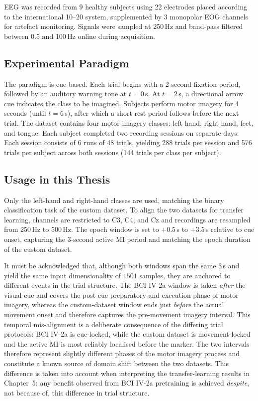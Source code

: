 \documentclass[english, bc, kiv, he, iso690alph, pdf]{fasthesis}
\begin{document}
EEG was recorded from 9 healthy subjects using 22 electrodes placed according to the international 10--20 system, supplemented by 3 monopolar EOG channels for artefact monitoring. Signals were sampled at 250\,Hz and band-pass filtered between 0.5 and 100\,Hz online during acquisition.

\subsection{Experimental Paradigm}

The paradigm is cue-based. Each trial begins with a 2-second fixation period, followed by an auditory warning tone at $t = 0$\,s. At $t = 2$\,s, a directional arrow cue indicates the class to be imagined. Subjects perform motor imagery for 4 seconds (until $t = 6$\,s), after which a short rest period follows before the next trial. The dataset contains four motor imagery classes: left hand, right hand, feet, and tongue. Each subject completed two recording sessions on separate days. Each session consists of 6 runs of 48 trials, yielding 288 trials per session and 576 trials per subject across both sessions (144 trials per class per subject).

\subsection{Usage in this Thesis}

Only the left-hand and right-hand classes are used, matching the binary classification task of the custom dataset. To align the two datasets for transfer learning, channels are restricted to C3, C4, and Cz and recordings are resampled from 250\,Hz to 500\,Hz. The epoch window is set to $+0.5$\,s to $+3.5$\,s relative to cue onset, capturing the 3-second active MI period and matching the epoch duration of the custom dataset.

It must be acknowledged that, although both windows span the same 3\,s and yield the same input dimensionality of $1501$ samples, they are anchored to different events in the trial structure. The BCI IV-2a window is taken \emph{after} the visual cue and covers the post-cue preparatory and execution phase of motor imagery, whereas the custom-dataset window ends just \emph{before} the actual movement onset and therefore captures the pre-movement imagery interval. This temporal mis-alignment is a deliberate consequence of the differing trial protocols: BCI IV-2a is cue-locked, while the custom dataset is movement-locked and the active MI is most reliably localised before the marker. The two intervals therefore represent slightly different phases of the motor imagery process and constitute a known source of domain shift between the two datasets. This difference is taken into account when interpreting the transfer-learning results in Chapter~5: any benefit observed from BCI IV-2a pretraining is achieved \emph{despite}, not because of, this difference in trial structure.
\end{document}
